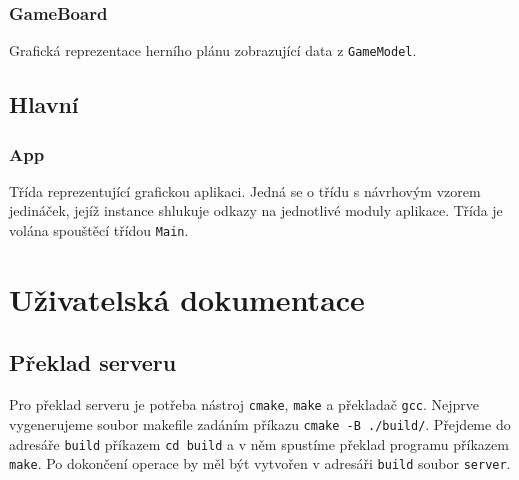 \documentclass[12pt, a4paper]{article} %
\begin{document}
	\subsubsection{GameBoard}
	\par Grafická reprezentace herního plánu zobrazující data z \texttt{GameModel}.
	\subsection{Hlavní}
	\subsubsection{App}
	\par Třída reprezentující grafickou aplikaci. Jedná se o třídu s návrhovým vzorem jedináček, jejíž  instance shlukuje odkazy na jednotlivé moduly aplikace. Třída je volána spouštěcí třídou \texttt{Main}.
	
	\section{Uživatelská dokumentace}
	\subsection{Překlad serveru}
	\par Pro překlad serveru je potřeba nástroj \texttt{cmake}, \texttt{make} a překladač \texttt{gcc}. Nejprve vygenerujeme soubor makefile zadáním příkazu \texttt{cmake -B ./build/}. Přejdeme do adresáře \texttt{build} příkazem \texttt{cd build} a v něm spustíme překlad programu příkazem \texttt{make}. Po dokončení operace by měl být vytvořen v adresáři \texttt{build} soubor \texttt{server}. 
\end{document}
